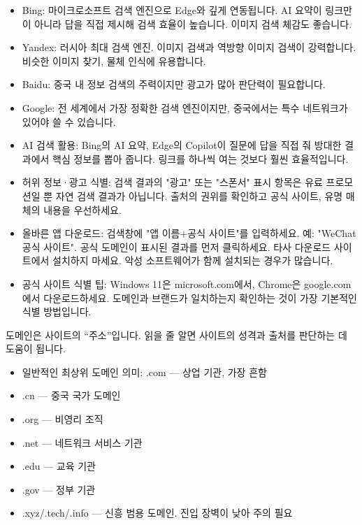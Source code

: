 
\begin{itemize}
  \item Bing: 마이크로소프트 검색 엔진으로 Edge와 깊게 연동됩니다. AI 요약이 링크만이 아니라 답을 직접 제시해 검색 효율이 높습니다. 이미지 검색 체감도 좋습니다.
  \item Yandex: 러시아 최대 검색 엔진. 이미지 검색과 역방향 이미지 검색이 강력합니다. 비슷한 이미지 찾기, 물체 인식에 유용합니다.
  \item Baidu: 중국 내 정보 검색의 주력이지만 광고가 많아 판단력이 필요합니다.
  \item Google: 전 세계에서 가장 정확한 검색 엔진이지만, 중국에서는 특수 네트워크가 있어야 쓸 수 있습니다.
\end{itemize}


\begin{itemize}
  \item AI 검색 활용: Bing의 AI 요약, Edge의 Copilot이 질문에 답을 직접 줘 방대한 결과에서 핵심 정보를 뽑아 줍니다. 링크를 하나씩 여는 것보다 훨씬 효율적입니다.
  \item 허위 정보·광고 식별: 검색 결과의 "광고" 또는 "스폰서" 표시 항목은 유료 프로모션일 뿐 자연 검색 결과가 아닙니다. 출처의 권위를 확인하고 공식 사이트, 유명 매체의 내용을 우선하세요.
  \item 올바른 앱 다운로드: 검색창에 "앱 이름+공식 사이트"를 입력하세요. 예: "WeChat 공식 사이트". 공식 도메인이 표시된 결과를 먼저 클릭하세요. 타사 다운로드 사이트에서 설치하지 마세요. 악성 소프트웨어가 함께 설치되는 경우가 많습니다.
  \item 공식 사이트 식별 팁: Windows 11은 microsoft.com에서, Chrome은 google.com에서 다운로드하세요. 도메인과 브랜드가 일치하는지 확인하는 것이 가장 기본적인 식별 방법입니다.
\end{itemize}


도메인은 사이트의 “주소”입니다. 읽을 줄 알면 사이트의 성격과 출처를 판단하는 데 도움이 됩니다.

\begin{itemize}
  \item 일반적인 최상위 도메인 의미: .com — 상업 기관, 가장 흔함
  \item .cn — 중국 국가 도메인
  \item .org — 비영리 조직
  \item .net — 네트워크 서비스 기관
  \item .edu — 교육 기관
  \item .gov — 정부 기관
  \item .xyz/.tech/.info — 신흥 범용 도메인. 진입 장벽이 낮아 주의 필요
\end{itemize}

